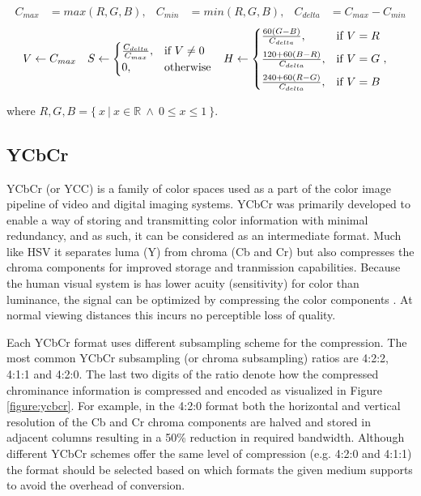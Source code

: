 \documentclass[thesis.tex]{subfiles}
\begin{document}
\begin{align*}
C_{max}&=max(R, G, B),	&	C_{min}&=min(R, G, B),	&	C_{delta}&=C_{max}-C_{min}
\end{align*}
\begin{align*}
V &\leftarrow C_{max}	&
S &\leftarrow
	\begin{cases}
		\frac{C_{delta}}{C_{max}}, & \text{if $V\neq0$}\\
		0, & \text{otherwise}
	\end{cases}			&
H &\leftarrow
	\begin{cases}
		\frac{60(G-B)}{C_{delta}}, & \text{if $V=R$}\vspace{2mm}\\
		\frac{120+60(B-R)}{C_{delta}}, & \text{if $V=G$}\vspace{2mm}\\
		\frac{240+60(R-G)}{C_{delta}}, & \text{if $V=B$}
	\end{cases},
\end{align*}

\noindent where $R, G, B = \{\ x\ \vert\ x \in \mathbb R\ \wedge\ 0 \leq x \leq 1\ \}$.


\subsection{YCbCr}
YCbCr (or YCC) is a family of color spaces used as a part of the color image pipeline of video and digital imaging systems. YCbCr was primarily developed to enable a way of storing and transmitting color information with minimal redundancy, and as such, it can be considered as an intermediate format. Much like HSV it separates luma (Y) from chroma (Cb and Cr) but also compresses the chroma components for improved storage and tranmission capabilities. Because the human visual system is has lower acuity (sensitivity) for color than luminance, the signal can be optimized by compressing the color components \cite{color_vision}. At normal viewing distances this incurs no perceptible loss of quality.

Each YCbCr format uses different subsampling scheme for the compression. The most common YCbCr subsampling (or chroma subsampling) ratios are 4:2:2, 4:1:1 and 4:2:0. The last two digits of the ratio denote how the compressed chrominance information is compressed and encoded as visualized in Figure \ref{figure:ycbcr}. For example, in the 4:2:0 format both the horizontal and vertical resolution of the Cb and Cr chroma components are halved and stored in adjacent columns resulting in a 50\% reduction in required bandwidth. Although different YCbCr schemes offer the same level of compression (e.g. 4:2:0 and 4:1:1) the format should be selected based on which formats the given medium supports to avoid the overhead of conversion.
\end{document}
